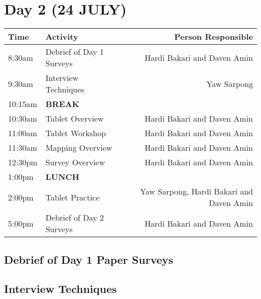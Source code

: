 \documentclass[a4paper,agenda,11pt]{meetingmins}
\begin{document}
\pagebreak

\section{Day 2 (24 JULY)}


\begin{tabularx}{\textwidth}{| l | X | r |} \hline
Time & Activity & Person Responsible \\ \hline \hline

8:30am &
Debrief of Day 1 Surveys &
Hardi Bakari and Daven Amin \\ \hline

9:30am &
Interview Techniques &
Yaw Sarpong \\ \hline

10:15am &
\textbf{BREAK} &
 \\ \hline

10:30am &
Tablet Overview &
Hardi Bakari and Daven Amin \\ \hline

11:00am & 
Tablet Workshop &
Hardi Bakari and Daven Amin \\ \hline

11:30am & 
Mapping Overview &
Hardi Bakari and Daven Amin \\ \hline

12:30pm & 
Survey Overview &
Hardi Bakari and Daven Amin \\ \hline

1:00pm & 
\textbf{LUNCH} &
 \\ \hline

2:00pm &
Tablet Practice &
Yaw Sarpong, Hardi Bakari and Daven Amin \\ \hline

5:00pm &
Debrief of Day 2 Surveys &
Hardi Bakari and Daven Amin \\ \hline

\end{tabularx}

\subsection{Debrief of Day 1 Paper Surveys}

\subsection{Interview Techniques}
\end{document}
